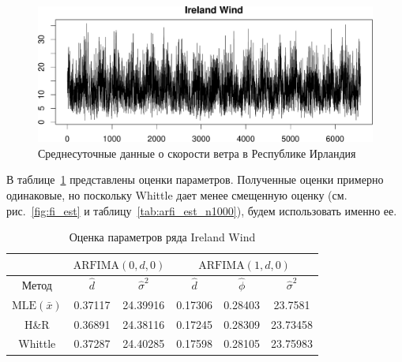 \documentclass[specialist,
substylefile = spbu_report.rtx,
subf,href,colorlinks=true, 12pt]{disser}
\theoremstyle{definition}
\begin{document}
\begin{figure}[h]
	\centering
	\includegraphics[width=\textwidth]{img/IrelandWind_ts.pdf}
	\caption{Среднесуточные данные о скорости ветра в Республике Ирландия}
	\label{fig:IrelandWind_ts}
\end{figure}

В таблице~\ref{tab:IrelandWind_est} представлены оценки параметров. Полученные оценки примерно одинаковые, но поскольку Whittle дает менее смещенную оценку (см. рис.~\ref{fig:fi_est} и таблицу~\ref{tab:arfi_est_n1000}), будем использовать именно ее.

\begin{table}[h]
	\centering
	\caption{Оценка параметров ряда Ireland Wind}
	\label{tab:IrelandWind_est}
	\begin{tabular}{|c|c|c|c|c|c|}
		\cline{2-6}
		\multicolumn{1}{c|}{}  & \multicolumn{2}{c|}{$\mathrm{ARFIMA}(0, d, 0)$} & \multicolumn{3}{c|}{$\mathrm{ARFIMA}(1, d, 0)$}                                             \\
		\hline
		Метод                  & $\hat d$                                        & $\hat\sigma^2$                                  & $\hat{d}$ & $\hat\phi$ & $\hat{\sigma}^2$ \\
		\hline
		$\mathrm{MLE}(\bar x)$ & 0.37117                                         & 24.39916                                        & 0.17306   & 0.28403    & 23.7581          \\
		H\&R                   & 0.36891                                         & 24.38116                                        & 0.17245   & 0.28309    & 23.73458         \\
		Whittle                & 0.37287                                         & 24.40285                                        & 0.17598   & 0.28105    & 23.75983         \\
		\hline
	\end{tabular}
\end{table}
\end{document}
